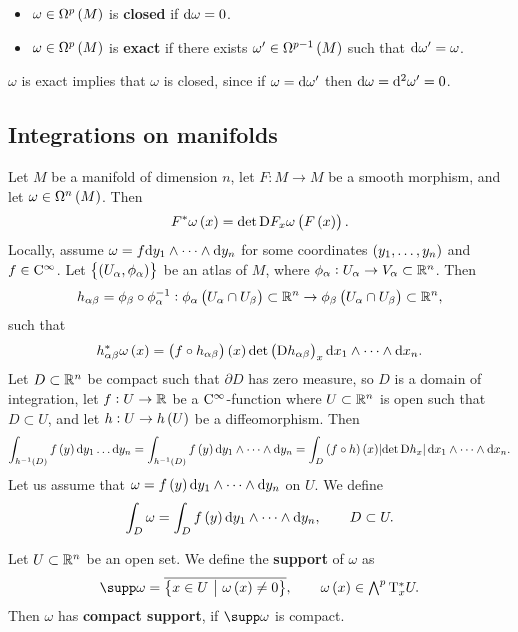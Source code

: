 
\begin{definition}
\hfill
\begin{itemize}
\item $ \omega \in \Omega^p\br{M} $ is \textbf{closed} if $ \mathrm{d}\omega = 0 $.
\item $ \omega \in \Omega^p\br{M} $ is \textbf{exact} if there exists $ \omega' \in \Omega^{p - 1}\br{M} $ such that $ \mathrm{d}\omega' = \omega $.
\end{itemize}
\end{definition}

$ \omega $ is exact implies that $ \omega $ is closed, since if $ \omega = \mathrm{d}\omega' $ then $ \mathrm{d}\omega = \mathrm{d}^2\omega' = 0 $.

\subsection{Integrations on manifolds}

Let $ M $ be a manifold of dimension $ n $, let $ F : M \to M $ be a smooth morphism, and let $ \omega \in \Omega^n\br{M} $. Then
$$ F^*\omega\br{x} = \det \D F_x\omega\br{F\br{x}}. $$
Locally, assume $ \omega = f\mathrm{d} y_1 \wedge \dots \wedge \mathrm{d} y_n $ for some coordinates $ \br{y_1, \dots, y_n} $ and $ f \in \mathrm{C}^\infty $. Let $ \cbr{\br{U_\alpha, \phi_\alpha}} $ be an atlas of $ M $, where $ \phi_\alpha : U_\alpha \to V_\alpha \subset \mathbb{R}^n $. Then
$$ h_{\alpha\beta} = \phi_\beta \circ \phi_\alpha^{-1} : \phi_\alpha\br{U_\alpha \cap U_\beta} \subset \RR^n \to \phi_\beta\br{U_\alpha \cap U_\beta} \subset \RR^n, $$
such that
$$ h_{\alpha\beta}^*\omega\br{x} = \br{f \circ h_{\alpha\beta}}\br{x}\det \br{\D h_{\alpha\beta}}_x\d x_1 \wedge \dots \wedge \d x_n. $$
Let $ D \subset \mathbb{R}^n $ be compact such that $ \partial D $ has zero measure, so $ D $ is a domain of integration, let $ f : U \to \mathbb{R} $ be a $ \mathrm{C}^\infty $-function where $ U \subset \mathbb{R}^n $ is open such that $ D \subset U $, and let $ h : U \to h\br{U} $ be a diffeomorphism. Then
$$ \int_{h^{-1}\br{D}} f\br{y}\d y_1 \dots \d y_n = \int_{h^{-1}\br{D}} f\br{y}\d y_1 \wedge \dots \wedge \d y_n = \int_{D} \br{f \circ h}\br{x}\abs{\det \D h_x}\d x_1 \wedge \dots \wedge \d x_n. $$
Let us assume that $ \omega = f\br{y}\d y_1 \wedge \dots \wedge \d y_n $ on $ U $. We define
$$ \int_D \omega = \int_D f\br{y}\d y_1 \wedge \dots \wedge \d y_n, \qquad D \subset U. $$

\begin{definition}
Let $ U \subset \mathbb{R}^n $ be an open set. We define the \textbf{support} of $ \omega $ as
$$ \supp \omega = \overline{\cbr{x \in U \st \omega\br{x} \ne 0}}, \qquad \omega\br{x} \in \textstyle\bigwedge^p\T_x^*U. $$
Then $ \omega $ has \textbf{compact support}, if $ \supp \omega $ is compact.
\end{definition}


